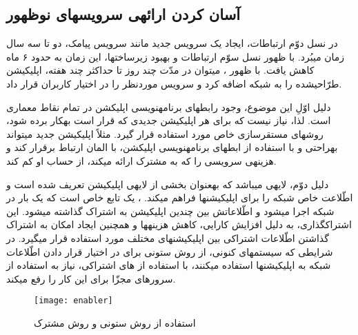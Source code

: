 \subsection{آسان کردن ارائه\nf ی سرویس\nf های نوظهور}
\label{benefits1}

در نسل دوّم ارتباطات، ایجاد یک سرویس جدید مانند سرویس پیامک، دو تا سه سال زمان می\nf بُرد. با ظهور نسل سوّم ارتباطات و بهبود زیرساخت\nf ها، این زمان به حدود ۶ ماه کاهش یافت. با ظهور ، می\nf توان در مدّت چند روز تا حداکثر چند هفته، اپلیکیشن طرّاحی\nf شده را به شبکه اضافه کرد و سرویس موردنظر را در اختیار کاربران قرار داد.

دلیل اوّلِ این موضوع، وجود رابط\nf های برنامه\nf نویسی اپلیکشن در تمام نقاط معماری  است. لذا، نیاز نیست که برای هر اپلیکیشن جدیدی که قرار است به\nf کار برده شود، روش\nf های مستقرسازی خاص مورد استفاده قرار گیرد. مثلاً اپلیکیشن جدید می\nf تواند به\nf راحتی و با استفاده از ابط\nf های برنامه\nf نویسی اپلیکشن، با المان  ارتباط برقرار کند و هزینه\nf ی سرویسی را که به مشترک ارائه می\nf کند، از حساب او کم کند\cite{blended}.

دلیل دوّم، لایه\nf ی  می\nf باشد که به\nf عنوان بخشی از لایه\nf ی اپلیکیشن تعریف شده است و اطّلاعت خاص شبکه را برای اپلیکیشن\nf ها فراهم می\nf کند. ، یک تابع خاص است که یک بار در شبکه اجرا می\nf شود و اطّلاعاتش بین چندین اپلیکیشن به اشتراک گذاشته می\nf شود. این اشتراک\nf گذاری، به دلیل افزایش کارایی، کاهش هزینه\nf ها و همچنین ایجاد امکان به اشتراک گذاشتن اطّلاعات اشتراکی بین اپلیکیشن\nf های مختلف مورد استفاده قرار می\nf گیرد. در شرایطی که سیستم\nf های کنونی، از روش ستونی برای در اختیار قرار دادن اطّلاعات شبکه به اپلیکیشن\nf ها استفاده می\nf کنند،  با استفاده از   های اشتراکی، نیاز به استفاده از سرورهای مجزّا برای این کار را رفع می\nf کند\cite{blended}.

\begin{figure}[h]
\centering
\texttt{[image: enabler]}
\caption{استفاده از روش ستونی و روش  مشترک}
\label{enabler}
\end{figure}


